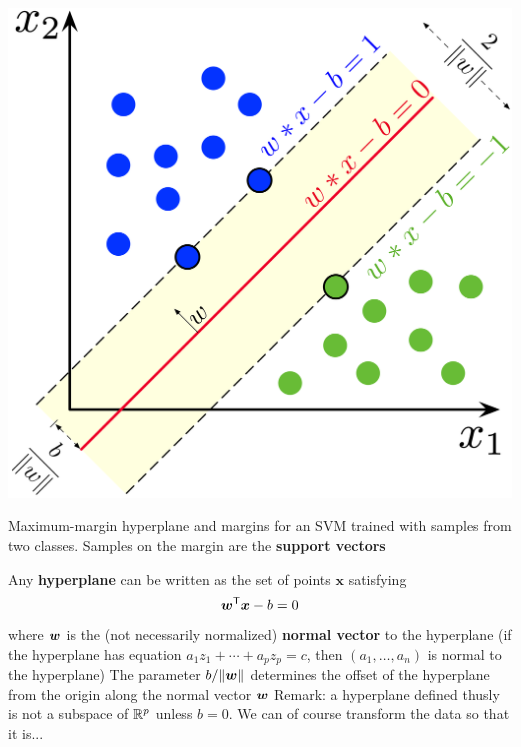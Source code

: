 \documentclass[aspectratio=169]{beamer}\usepackage[]{graphicx}\usepackage[]{xcolor}
\begin{document}
\begin{frame}
    \begin{minipage}{0.7\textwidth}
        \includegraphics[height=\textheight]{FIGS/SVM_margin}
    \end{minipage}
    \begin{minipage}{0.28\textwidth}
        Maximum-margin hyperplane and margins for an SVM trained with samples from two classes. Samples on the margin are the \textbf{support vectors}
    \end{minipage}
\end{frame}

\begin{frame}
    Any \textbf{hyperplane} can be written as the set of points $\mathbf{x}$ satisfying
    \[
        \bm{w}^\mathsf{T} \bm{x} - b = 0
    \]
    where $\bm{w}$ is the (not necessarily normalized) \textbf{normal vector} to the hyperplane (if the hyperplane has equation $a_1z_1+\cdots+a_pz_p=c$, then $(a_1,\ldots,a_n)$ is normal to the hyperplane)
    \vfill
    The parameter $b/\|\bm{w}\|$ determines the offset of the hyperplane from the origin along the normal vector $\bm{w}$
    \vfill
    Remark: a hyperplane defined thusly is not a subspace of $\mathbb{R}^p$ unless $b=0$. We can of course transform the data so that it is...
\end{frame}
\end{document}

